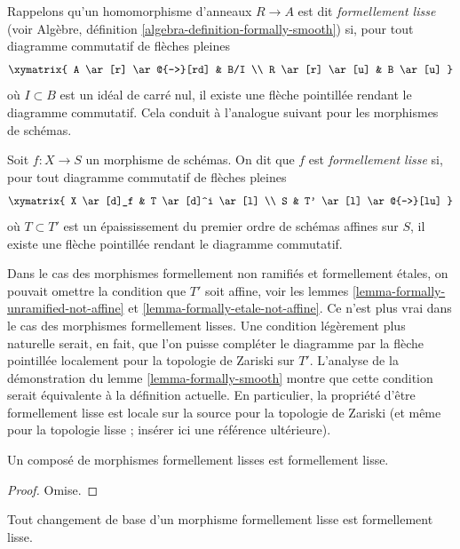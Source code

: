 \medskip\noindent
Rappelons qu'un homomorphisme d'anneaux $R \to A$ est dit {\it formellement lisse}
(voir Algèbre, définition \ref{algebra-definition-formally-smooth})
si, pour tout diagramme commutatif de flèches pleines
$$
\xymatrix{
A \ar[r] \ar@{-->}[rd] & B/I \\
R \ar[r] \ar[u] & B \ar[u]
}
$$
où $I \subset B$ est un idéal de carré nul, il existe une flèche
pointillée rendant le diagramme commutatif. Cela conduit
à l'analogue suivant pour les morphismes de schémas.

\begin{definition}
\label{definition-formally-smooth}
Soit $f : X \to S$ un morphisme de schémas.
On dit que $f$ est {\it formellement lisse} si, pour tout diagramme commutatif de flèches pleines
$$
\xymatrix{
X \ar[d]_f & T \ar[d]^i \ar[l] \\
S & T' \ar[l] \ar@{-->}[lu]
}
$$
où $T \subset T'$ est un épaississement du premier ordre de schémas affines sur $S$,
il existe une flèche pointillée rendant le diagramme commutatif.
\end{definition}

\noindent
Dans le cas des morphismes formellement non ramifiés et formellement étales,
on pouvait omettre la condition que $T'$ soit affine, voir
les lemmes \ref{lemma-formally-unramified-not-affine} et
\ref{lemma-formally-etale-not-affine}.
Ce n'est plus vrai dans le cas des morphismes formellement lisses.
Une condition légèrement plus naturelle serait, en fait, que l'on puisse
compléter le diagramme par la flèche pointillée localement pour la topologie de Zariski sur $T'$.
L'analyse de la démonstration du
lemme \ref{lemma-formally-smooth}
montre que cette condition serait équivalente à la définition
actuelle. En particulier, la propriété d'être formellement lisse est
locale sur la source pour la topologie de Zariski (et même pour la topologie lisse ;
insérer ici une référence ultérieure).

\begin{lemma}
\label{lemma-composition-formally-smooth}
Un composé de morphismes formellement lisses est formellement lisse.
\end{lemma}

\begin{proof}
Omise.
\end{proof}

\begin{lemma}
\label{lemma-base-change-formally-smooth}
Tout changement de base d'un morphisme formellement lisse est formellement lisse.
\end{lemma}

